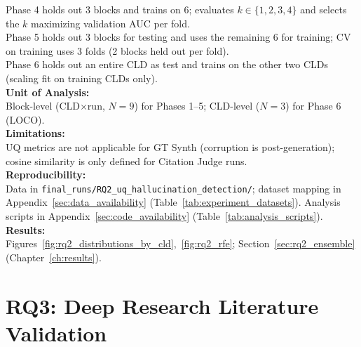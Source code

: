 Phase 4 holds out 3 blocks and trains on 6; evaluates \(k \in \{1,2,3,4\}\) and selects the \(k\) maximizing validation AUC per fold.\\
Phase 5 holds out 3 blocks for testing and uses the remaining 6 for training; CV on training uses 3 folds (2 blocks held out per fold).\\
Phase 6 holds out an entire CLD as test and trains on the other two CLDs (scaling fit on training CLDs only).\\
\textbf{Unit of Analysis:}\\
Block-level (CLD$\times$run, $N=9$) for Phases 1--5; CLD-level ($N=3$) for Phase 6 (LOCO).\\
\textbf{Limitations:}\\
UQ metrics are not applicable for GT Synth (corruption is post-generation); cosine similarity is only defined for Citation Judge runs.\\
\textbf{Reproducibility:}\\
Data in \texttt{final\_runs/RQ2\_uq\_hallucination\_detection/}; dataset mapping in Appendix~\ref{sec:data_availability} (Table~\ref{tab:experiment_datasets}). Analysis scripts in Appendix~\ref{sec:code_availability} (Table~\ref{tab:analysis_scripts}).\\
\textbf{Results:}\\
Figures~\ref{fig:rq2_distributions_by_cld},~\ref{fig:rq2_rfe}; Section~\ref{sec:rq2_ensemble} (Chapter~\ref{ch:results}).
    
\section{RQ3: Deep Research Literature Validation}
\label{sec:rq3_experiments}

\begin{center}
\end{center}


